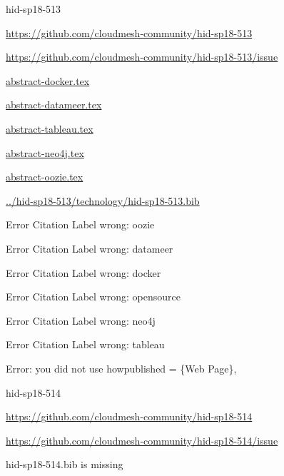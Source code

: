 \begin{IU}

hid-sp18-513

\url{https://github.com/cloudmesh-community/hid-sp18-513}

\url{https://github.com/cloudmesh-community/hid-sp18-513/issue}

\href{https://github.com/cloudmesh-community/hid-sp18-513/blob/master//technology/abstract-docker.tex}{abstract-docker.tex}

\href{https://github.com/cloudmesh-community/hid-sp18-513/blob/master//technology/abstract-datameer.tex}{abstract-datameer.tex}

\href{https://github.com/cloudmesh-community/hid-sp18-513/blob/master//technology/abstract-tableau.tex}{abstract-tableau.tex}

\href{https://github.com/cloudmesh-community/hid-sp18-513/blob/master//technology/abstract-neo4j.tex}{abstract-neo4j.tex}

\href{https://github.com/cloudmesh-community/hid-sp18-513/blob/master//technology/abstract-oozie.tex}{abstract-oozie.tex}

\href{https://github.com/cloudmesh-community/hid-sp18-513/blob/master//technology/hid-sp18-513.bib}{../hid-sp18-513/technology/hid-sp18-513.bib}

 Error Citation Label wrong: oozie

 Error Citation Label wrong: datameer

 Error Citation Label wrong: docker

 Error Citation Label wrong: opensource

 Error Citation Label wrong: neo4j

 Error Citation Label wrong: tableau

Error: you did not use howpublished = \{Web Page\},

\end{IU}


\begin{IU}

hid-sp18-514

\url{https://github.com/cloudmesh-community/hid-sp18-514}

\url{https://github.com/cloudmesh-community/hid-sp18-514/issue}

hid-sp18-514.bib is missing

\end{IU}


